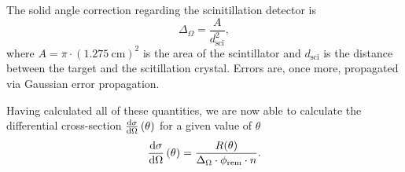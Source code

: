 The solid angle correction regarding the scinitillation detector is
\begin{equation*}
	\Delta_\Omega = \frac{A}{d_\text{sci}^2},
\end{equation*}
where $A=\pi\cdot\left(\SI{1.275}{\cm}\right)^2$ is the area of the scintillator and $d_\text{sci}$ is the distance between the target and the scitillation crystal.
Errors are, once more, propagated via Gaussian error propagation.

Having calculated all of these quantities, we are now able to calculate the differential cross-section $\frac{\text{d}\sigma}{\text{d}\Omega}\left(\theta\right)$ for a given value of $\theta$
\begin{equation*}
	\frac{\text{d}\sigma}{\text{d}\Omega}\left(\theta\right) = \frac{R(\theta)}{\Delta_\Omega\cdot\phi_\text{rem}\cdot n}.
\end{equation*}

